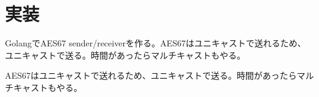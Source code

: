 \chapter{実装}
\label{chap:implementation}

GolangでAES67 sender/receiverを作る。AES67はユニキャストで送れるため、ユニキャストで送る。時間があったらマルチキャストもやる。

AES67はユニキャストで送れるため、ユニキャストで送る。時間があったらマルチキャストもやる。
